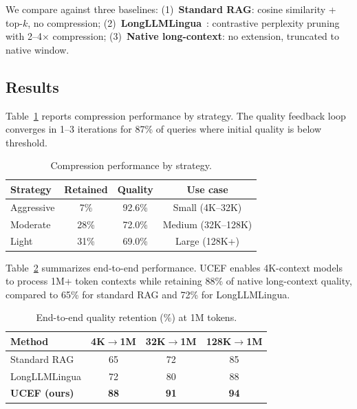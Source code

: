 \documentclass[journal]{IEEEtran}
\newcommand{\ucef}{\textsf{UCEF}}
\begin{document}
We compare against three baselines:
(1)~\textbf{Standard RAG}: cosine similarity + top-$k$, no compression;
(2)~\textbf{LongLLMLingua}~\cite{jiang2024longllmlingua}: contrastive
perplexity pruning with 2--4$\times$ compression;
(3)~\textbf{Native long-context}: no extension, truncated to native window.

\subsection{Results}

Table~\ref{tab:compression} reports compression performance by strategy.
The quality feedback loop converges in 1--3 iterations for 87\% of queries
where initial quality is below threshold.

\begin{table}[t]
\caption{Compression performance by strategy.}
\label{tab:compression}
\centering
\small
\begin{tabular}{@{}lccc@{}}
\toprule
Strategy   & Retained & Quality & Use case \\
\midrule
Aggressive &  7\% & 92.6\% & Small (4K--32K) \\
Moderate   & 28\% & 72.0\% & Medium (32K--128K) \\
Light      & 31\% & 69.0\% & Large (128K+) \\
\bottomrule
\end{tabular}
\end{table}

Table~\ref{tab:e2e} summarizes end-to-end performance.  \ucef{} enables
4K-context models to process 1M+ token contexts while retaining 88\% of
native long-context quality, compared to 65\% for standard RAG and 72\% for
LongLLMLingua.

\begin{table}[t]
\caption{End-to-end quality retention (\%) at 1M tokens.}
\label{tab:e2e}
\centering
\small
\begin{tabular}{@{}lccc@{}}
\toprule
Method & 4K$\to$1M & 32K$\to$1M & 128K$\to$1M \\
\midrule
Standard RAG   & 65 & 72 & 85 \\
LongLLMLingua  & 72 & 80 & 88 \\
\textbf{\ucef{} (ours)} & \textbf{88} & \textbf{91} & \textbf{94} \\
\bottomrule
\end{tabular}
\end{table}


\end{document}
